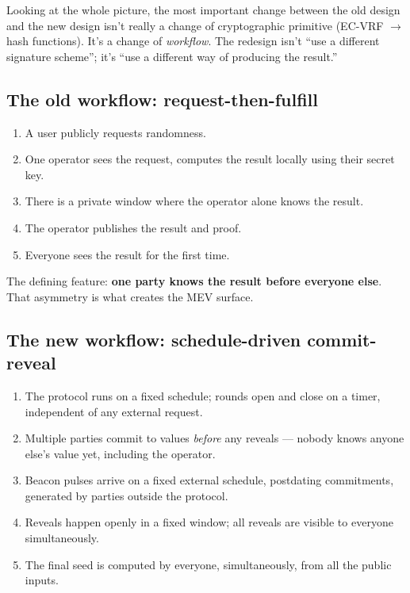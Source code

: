 \documentclass[11pt]{article}
\begin{document}
Looking at the whole picture, the most important change between the old design and the new design isn't really a change of cryptographic primitive (EC-VRF $\to$ hash functions). It's a change of \emph{workflow}. The redesign isn't ``use a different signature scheme''; it's ``use a different way of producing the result.''

\subsection*{The old workflow: request-then-fulfill}

\begin{enumerate}[leftmargin=2em, itemsep=2pt]
\item A user publicly requests randomness.
\item One operator sees the request, computes the result locally using their secret key.
\item There is a private window where the operator alone knows the result.
\item The operator publishes the result and proof.
\item Everyone sees the result for the first time.
\end{enumerate}

The defining feature: \textbf{one party knows the result before everyone else}. That asymmetry is what creates the MEV surface.

\subsection*{The new workflow: schedule-driven commit-reveal}

\begin{enumerate}[leftmargin=2em, itemsep=2pt]
\item The protocol runs on a fixed schedule; rounds open and close on a timer, independent of any external request.
\item Multiple parties commit to values \emph{before} any reveals --- nobody knows anyone else's value yet, including the operator.
\item Beacon pulses arrive on a fixed external schedule, postdating commitments, generated by parties outside the protocol.
\item Reveals happen openly in a fixed window; all reveals are visible to everyone simultaneously.
\item The final seed is computed by everyone, simultaneously, from all the public inputs.
\end{enumerate}
\end{document}
